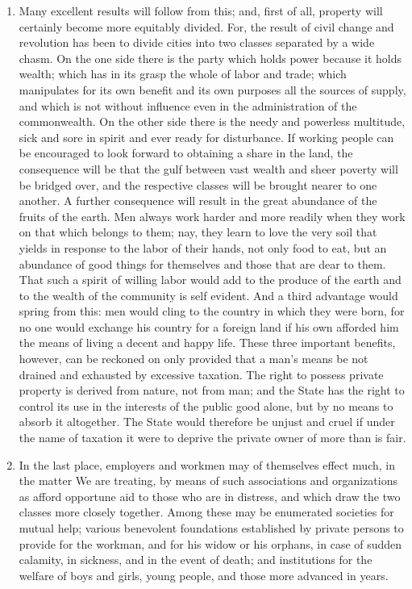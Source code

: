 \documentclass{book}
\begin{document}
\begin{enumerate}
	\item Many excellent results will follow from this; and, first of all, property will certainly become more equitably divided. For, the result of civil change and revolution has been to divide cities into two classes separated by a wide chasm. On the one side there is the party which holds power because it holds wealth; which has in its grasp the whole of labor and trade; which manipulates for its own benefit and its own purposes all the sources of supply, and which is not without influence even in the administration of the commonwealth. On the other side there is the needy and powerless multitude, sick and sore in spirit and ever ready for disturbance. If working people can be encouraged to look forward to obtaining a share in the land, the consequence will be that the gulf between vast wealth and sheer poverty will be bridged over, and the respective classes will be brought nearer to one another. A further consequence will result in the great abundance of the fruits of the earth. Men always work harder and more readily when they work on that which belongs to them; nay, they learn to love the very soil that yields in response to the labor of their hands, not only food to eat, but an abundance of good things for themselves and those that are dear to them. That such a spirit of willing labor would add to the produce of the earth and to the wealth of the community is self evident. And a third advantage would spring from this: men would cling to the country in which they were born, for no one would exchange his country for a foreign land if his own afforded him the means of living a decent and happy life. These three important benefits, however, can be reckoned on only provided that a man’s means be not drained and exhausted by excessive taxation. The right to possess private property is derived from nature, not from man; and the State has the right to control its use in the interests of the public good alone, but by no means to absorb it altogether. The State would therefore be unjust and cruel if under the name of taxation it were to deprive the private owner of more than is fair.


	\item In the last place, employers and workmen may of themselves effect much, in the matter We are treating, by means of such associations and organizations as afford opportune aid to those who are in distress, and which draw the two classes more closely together. Among these may be enumerated societies for mutual help; various benevolent foundations established by private persons to provide for the workman, and for his widow or his orphans, in case of sudden calamity, in sickness, and in the event of death; and institutions for the welfare of boys and girls, young people, and those more advanced in years.



\end{enumerate}
\end{document}
